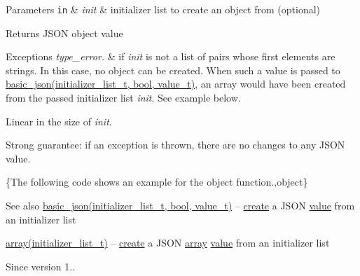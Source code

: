 \begin{DoxyParams}[1]{Parameters}
\mbox{\tt in}  & {\em init} & initializer list to create an object from (optional)\\
\hline
\end{DoxyParams}
\begin{DoxyReturn}{Returns}
J\+S\+ON object value
\end{DoxyReturn}

\begin{DoxyExceptions}{Exceptions}
{\em type\+\_\+error.} & if {\itshape init} is not a list of pairs whose first elements are strings. In this case, no object can be created. When such a value is passed to \hyperlink{classnlohmann_1_1basic__json_aeac617faf3448d6d2cb33a020be01d37}{basic\+\_\+json(initializer\+\_\+list\+\_\+t, bool, value\+\_\+t)}, an array would have been created from the passed initializer list {\itshape init}. See example below.\\
\hline
\end{DoxyExceptions}
Linear in the size of {\itshape init}.

Strong guarantee\+: if an exception is thrown, there are no changes to any J\+S\+ON value.

\{The following code shows an example for the {\ttfamily object} function.,object\}

\begin{DoxySeeAlso}{See also}
\hyperlink{classnlohmann_1_1basic__json_aeac617faf3448d6d2cb33a020be01d37}{basic\+\_\+json(initializer\+\_\+list\+\_\+t, bool, value\+\_\+t)} -- \hyperlink{classnlohmann_1_1basic__json_a49cba7a0d3a355161e2b62b437b80936}{create} a J\+S\+ON \hyperlink{classnlohmann_1_1basic__json_ac9e014095170d72c4c57e3daf8efc059}{value} from an initializer list 

\hyperlink{classnlohmann_1_1basic__json_a2c8d8f5741aedadac8f3bffd8f2ce13e}{array(initializer\+\_\+list\+\_\+t)} -- \hyperlink{classnlohmann_1_1basic__json_a49cba7a0d3a355161e2b62b437b80936}{create} a J\+S\+ON \hyperlink{classnlohmann_1_1basic__json_ad2b075c694e4564c9742d2c8db7c7c5f}{array} \hyperlink{classnlohmann_1_1basic__json_ac9e014095170d72c4c57e3daf8efc059}{value} from an initializer list
\end{DoxySeeAlso}
\begin{DoxySince}{Since}
version 1.. 
\end{DoxySince}
